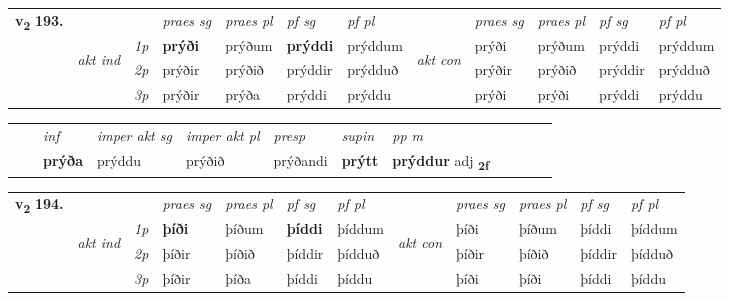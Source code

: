 \begin{tabular}{llllllllllll} \toprule
\multirow{4}{*}{{{\textbf{v{\textsubscript{2}}} \Large{\textbf{193.}}}}}  & &   &  \textit{praes sg}  & \textit{praes pl}  &\textit{ pf sg} & \textit{pf pl} &  &  \textit{praes sg}  & \textit{praes pl}  & \textit{pf sg} & \textit{pf pl } \\*
	\cmidrule{4-7} \cmidrule{9-12}
 & \multirow{3}{*}{\begin{turn}{90}\textit{akt ind}\end{turn}} & {\textit{1p}} & \textbf{prýði} & prýðum    & \textbf{prýddi} & prýddum & \multirow{3}{*}{\begin{turn}{90}\textit{akt con}\end{turn}} &prýði & prýðum & prýddi & prýddum\\*
& &  {\textit{2p}} &  prýðir  & prýðið   & prýddir & prýdduð & & prýðir & prýðið & prýddir & prýdduð \\*
& &  {\textit{3p}} & prýðir & prýða   & prýddi & prýddu & & prýði & prýði& prýddi & prýddu  \\*
\cmidrule{4-7} \cmidrule{9-12}
\end{tabular}


\begin{tabular}{llllllllllll}
 & & \textit{inf} & \textit{imper akt sg} & \textit{imper akt pl}   & \textit{presp} & \textit{supin}  & \textit{pp m}     \\*
  & & \textbf{prýða} & prýddu  & prýðið   & prýðandi &  \textbf{prýtt}  & \textbf{prýddur} adj \textbf{\textsubscript{2f}} \\*
\cmidrule{1-12}
\end{tabular}



\begin{tabular}{llllllllllll} \toprule
\multirow{4}{*}{{{\textbf{v{\textsubscript{2}}} \Large{\textbf{194.}}}}}  & &   &  \textit{praes sg}  & \textit{praes pl}  &\textit{ pf sg} & \textit{pf pl} &  &  \textit{praes sg}  & \textit{praes pl}  & \textit{pf sg} & \textit{pf pl } \\*
	\cmidrule{4-7} \cmidrule{9-12}
 & \multirow{3}{*}{\begin{turn}{90}\textit{akt ind}\end{turn}} & {\textit{1p}} & \textbf{þíði} & þíðum    & \textbf{þíddi} & þíddum & \multirow{3}{*}{\begin{turn}{90}\textit{akt con}\end{turn}} &þíði & þíðum & þíddi & þíddum\\*
& &  {\textit{2p}} &  þíðir  & þíðið   & þíddir & þídduð & & þíðir & þíðið & þíddir & þídduð \\*
& &  {\textit{3p}} & þíðir & þíða   & þíddi & þíddu & & þíði & þíði& þíddi & þíddu  \\*
\cmidrule{4-7} \cmidrule{9-12}
\end{tabular}


